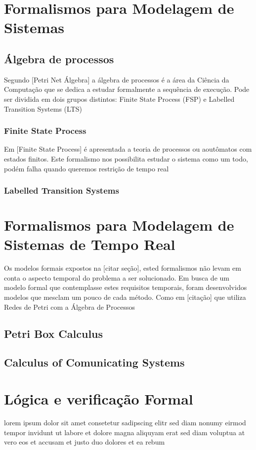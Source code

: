 \section{Formalismos para Modelagem de Sistemas}
\subsection{Álgebra de processos}
Segundo [Petri Net Álgebra] a álgebra de processos é a área da Ciência da Computação que se dedica
a estudar formalmente a sequência de execução. Pode ser dividida em dois
grupos distintos: Finite State Process (FSP) e Labelled Transition Systems (LTS)
\subsubsection{Finite State Process}
Em [Finite State Process] é apresentada a teoria de processos ou aoutômatos com estados finitos.
Este formalismo nos possibilita estudar o sistema como um todo, podém falha quando queremos restrição de tempo real
\subsubsection{Labelled Transition Systems}

\section{Formalismos para Modelagem de Sistemas de Tempo Real}
Os modelos formais expostos na [citar seção], ested formalismos não levam em conta o aspecto temporal do problema
a ser solucionado.
Em busca de um modelo formal que contemplasse estes requisitos temporais, foram desenvolvidos modelos que mesclam
um pouco de cada método. Como em [citação] que utiliza Redes de Petri com a Álgebra de Processos
\subsection{Petri Box Calculus}
\lipsum[1]
\subsection{Calculus of Comunicating Systems}
\lipsum[1]
\section{Lógica e verificação Formal}
lorem ipsum dolor sit amet consetetur sadipscing elitr sed diam nonumy
eirmod tempor invidunt ut labore et dolore magna aliquyam erat sed diam
voluptua at vero eos et accusam et justo duo dolores et ea rebum

